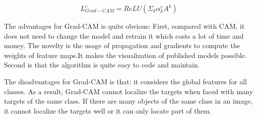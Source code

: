 \documentclass[conference]{IEEEtran}
\begin{document}
$$L_{Grad-CAM}^{c}=ReLU(\Sigma_{k}\alpha_{k}^{c}A^{k})$$

The advantages for Grad-CAM is quite obvious: First, compared with CAM, it does not need to change the model and retrain it which costs a lot of time and money. 
The novelty is the usage of propagation and gradients to compute the weights of feature maps.It makes the visualization of published models possible. Second is that the algorithm is quite easy to code and maintain.\par
The disadvantages for Grad-CAM is that: it considers the global features for all classes. As a result, Grad-CAM cannot localize the targets when faced with many targets of the same class. If there are many objects of the same class in an image, it cannot localize the targets well or it can only locate part of them.
\end{document}

